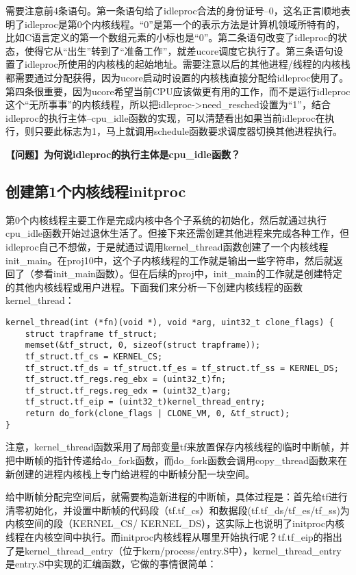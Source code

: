 需要注意前4条语句。第一条语句给了idleproc合法的身份证号--0，这名正言顺地表明了idleproc是第0个内核线程。``0''是第一个的表示方法是计算机领域所特有的，比如C语言定义的第一个数组元素的小标也是``0''。第二条语句改变了idleproc的状态，使得它从``出生''转到了``准备工作''，就差ucore调度它执行了。第三条语句设置了idleproc所使用的内核栈的起始地址。需要注意以后的其他进程/线程的内核栈都需要通过分配获得，因为ucore启动时设置的内核栈直接分配给idleproc使用了。第四条很重要，因为ucore希望当前CPU应该做更有用的工作，而不是运行idleproc这个``无所事事''的内核线程，所以把idleproc-\textgreater{}need\_resched设置为``1''，结合idleproc的执行主体--cpu\_idle函数的实现，可以清楚看出如果当前idleproc在执行，则只要此标志为1，马上就调用schedule函数要求调度器切换其他进程执行。

\textbf{【问题】为何说idleproc的执行主体是cpu\_idle函数？}

\subsection{创建第1个内核线程initproc}\label{ux521bux5efaux7b2c1ux4e2aux5185ux6838ux7ebfux7a0binitproc}

第0个内核线程主要工作是完成内核中各个子系统的初始化，然后就通过执行cpu\_idle函数开始过退休生活了。但接下来还需创建其他进程来完成各种工作，但idleproc自己不想做，于是就通过调用kernel\_thread函数创建了一个内核线程init\_main。在proj10中，这个子内核线程的工作就是输出一些字符串，然后就返回了（参看init\_main函数）。但在后续的proj中，init\_main的工作就是创建特定的其他内核线程或用户进程。下面我们来分析一下创建内核线程的函数kernel\_thread：

\begin{lstlisting}
kernel_thread(int (*fn)(void *), void *arg, uint32_t clone_flags) {
    struct trapframe tf_struct;
    memset(&tf_struct, 0, sizeof(struct trapframe));
    tf_struct.tf_cs = KERNEL_CS;
    tf_struct.tf_ds = tf_struct.tf_es = tf_struct.tf_ss = KERNEL_DS;
    tf_struct.tf_regs.reg_ebx = (uint32_t)fn;
    tf_struct.tf_regs.reg_edx = (uint32_t)arg;
    tf_struct.tf_eip = (uint32_t)kernel_thread_entry;
    return do_fork(clone_flags | CLONE_VM, 0, &tf_struct);
}
\end{lstlisting}

注意，kernel\_thread函数采用了局部变量tf来放置保存内核线程的临时中断帧，并把中断帧的指针传递给do\_fork函数，而do\_fork函数会调用copy\_thread函数来在新创建的进程内核栈上专门给进程的中断帧分配一块空间。

给中断帧分配完空间后，就需要构造新进程的中断帧，具体过程是：首先给tf进行清零初始化，并设置中断帧的代码段（tf.tf\_cs）和数据段(tf.tf\_ds/tf\_es/tf\_ss)为内核空间的段（KERNEL\_CS/
KERNEL\_DS），这实际上也说明了initproc内核线程在内核空间中执行。而initproc内核线程从哪里开始执行呢？tf.tf\_eip的指出了是kernel\_thread\_entry（位于kern/process/entry.S中），kernel\_thread\_entry是entry.S中实现的汇编函数，它做的事情很简单：


